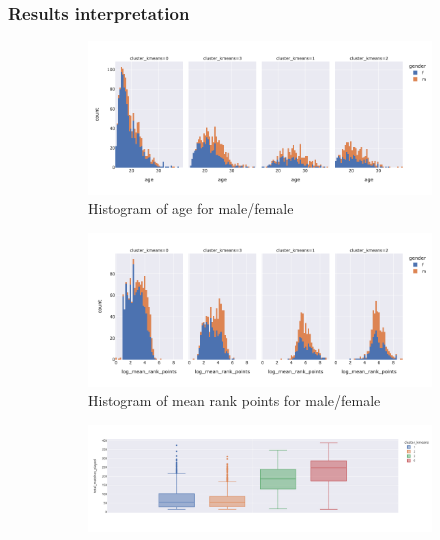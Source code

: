 \subsubsection{Results interpretation}
\begin{figure}[h]
  \begin{subfigure}[b]{0.48\textwidth}
		\includegraphics[width=\textwidth]{plots/kmeans/hist_age.png}
		\caption{Histogram of age for male/female}
		\label{fig:kmeans_hist_age}
  \end{subfigure}
  \begin{subfigure}[b]{0.48\textwidth}
		\includegraphics[width=\textwidth]{plots/kmeans/hist_log_mean_rank_points.png}
		\caption{Histogram of mean rank points for male/female}
		\label{fig:kmeans_hist_rank_points}
  \end{subfigure}
	\begin{subfigure}[b]{0.48\textwidth}
		\includegraphics[width=\textwidth]{plots/kmeans/kmeans-box-plot-matches-played.png}

\end{subfigure}
\end{figure}
